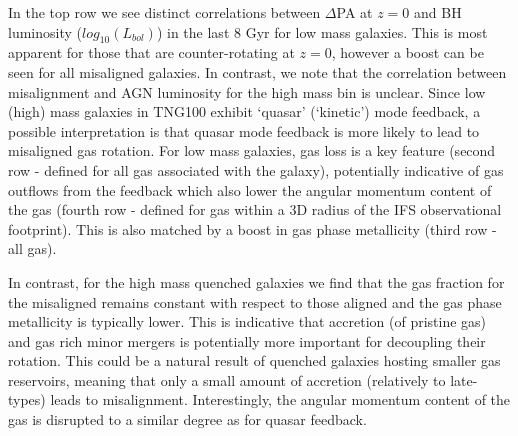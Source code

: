 \documentclass[fleqn,usenatbib]{mnras}
\begin{document}
In the top row we see distinct correlations between $\Delta$PA at $z=0$ and BH luminosity ($log_{10}(L_{bol})$) in the last 8 Gyr for low mass galaxies. This is most apparent for those that are counter-rotating at $z=0$, however a boost can be seen for all misaligned galaxies. In contrast, we note that the correlation between misalignment and AGN luminosity for the high mass bin is unclear. Since low (high) mass galaxies in TNG100 exhibit `quasar' (`kinetic') mode feedback, a possible interpretation is that quasar mode feedback is more likely to lead to misaligned gas rotation. For low mass galaxies, gas loss is a key feature (second row - defined for all gas associated with the galaxy), potentially indicative of gas outflows from the feedback which also lower the angular momentum content of the gas (fourth row - defined for gas within a 3D radius of the IFS observational footprint). This is also matched by a boost in gas phase metallicity (third row - all gas).

In contrast, for the high mass quenched galaxies we find that the gas fraction for the misaligned remains constant with respect to those aligned and the gas phase metallicity is typically lower. This is indicative that accretion (of pristine gas) and gas rich minor mergers is potentially more important for decoupling their rotation. This could be a natural result of quenched galaxies hosting smaller gas reservoirs, meaning that only a small amount of accretion (relatively to late-types) leads to misalignment. Interestingly, the angular momentum content of the gas is disrupted to a similar degree as for quasar feedback. 

\end{document}
